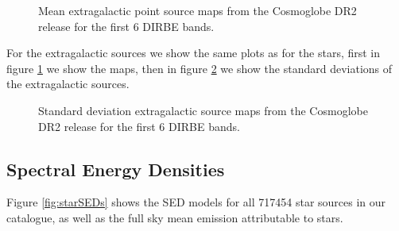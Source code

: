 \documentclass{aa}
\begin{document}
\begin{figure}
  \centering
  \caption{Mean extragalactic point source maps from the Cosmoglobe DR2 release for the first 6 DIRBE bands. }
  \label{fig:exgalT}
\end{figure}

For the extragalactic sources we show the same plots as for the stars, first in figure \ref{fig:exgalT} we show the maps, then in figure \ref{fig:exgalstd} we show the standard deviations of the extragalactic sources. 

\begin{figure}
  \centering
  \caption{Standard deviation extragalactic source maps from the Cosmoglobe DR2 release for the first 6 DIRBE bands. }
  \label{fig:exgalstd}
\end{figure}



\subsection{Spectral Energy Densities}

Figure \ref{fig:starSEDs} shows the SED models for all 717454 star sources in our catalogue, as well as the full sky mean emission attributable to stars. 
\end{document}
